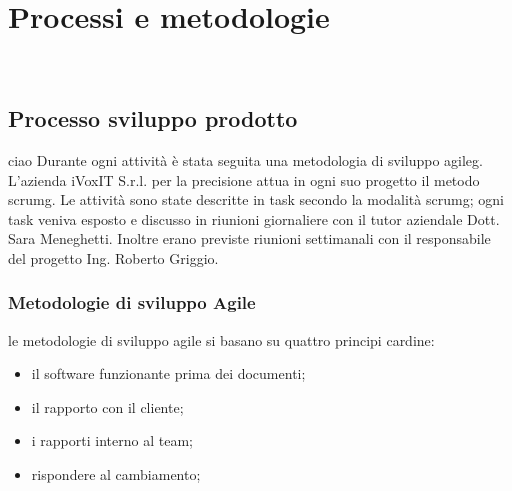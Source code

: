 
\chapter{Processi e metodologie}
\label{cap:processi-metodologie}

\\

\section{Processo sviluppo prodotto}
ciao
Durante ogni attività è stata seguita una metodologia di sviluppo \gls{agileg}. L'azienda iVoxIT S.r.l. per la precisione attua in ogni suo progetto il metodo \gls{scrumg}. Le attività sono state descritte in task secondo la modalità \gls{scrumg}; ogni task veniva esposto e discusso in riunioni giornaliere con il tutor aziendale Dott. Sara Meneghetti. Inoltre erano previste riunioni settimanali con il responsabile del progetto Ing. Roberto Griggio.

\subsection{Metodologie di sviluppo Agile}
le metodologie di sviluppo agile si basano su quattro principi cardine:
\begin{itemize}
    \item il software funzionante prima dei documenti;
    \item il rapporto con il cliente;
    \item i rapporti interno al team;
    \item rispondere al cambiamento;
\end{itemize}

